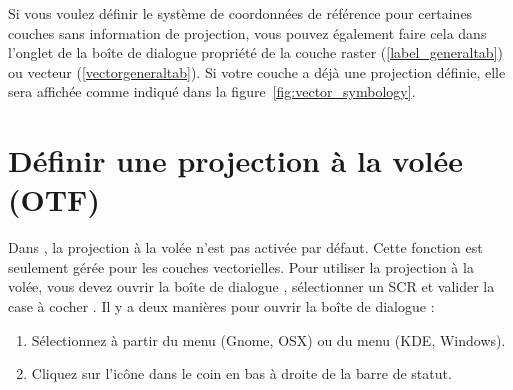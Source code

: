 Si vous voulez définir le système de coordonnées de référence pour certaines
couches sans information de projection, vous pouvez également faire cela
dans l'onglet  de la boîte de dialogue propriété de la couche
raster (\ref{label_generaltab}) ou vecteur (\ref{vectorgeneraltab}). 
Si votre couche a déjà une projection définie, elle
sera affichée comme indiqué dans la figure~\ref{fig:vector_symbology}.

\section{Définir une projection à la volée (OTF)}\label{label_projstart}

Dans \qg, la projection à la volée n'est pas activée par défaut. Cette fonction est
seulement gérée pour les couches vectorielles. Pour utiliser la projection à la
volée, vous devez ouvrir la boîte de dialogue
, sélectionner un 
SCR et valider la case à cocher . Il y a deux manières pour ouvrir la boîte de dialogue :

\begin{enumerate}
\item Sélectionnez  à partir du 
menu  (Gnome, OSX) ou du menu  (KDE, Windows).

\item Cliquez sur l'icône  dans
le coin en bas à droite de la barre de statut.
\end{enumerate}

